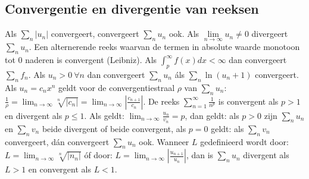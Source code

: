 \subsection{Convergentie en divergentie van reeksen}
Als $\sum\limits_n|u_n|$ convergeert, convergeert $\sum\limits_n u_n$ ook.
\npar
Als $\lim\limits_{n\rightarrow\infty}u_n\neq0$ divergeert $\sum\limits_n u_n$.
\npar
Een alternerende reeks waarvan de termen in absolute waarde monotoon tot 0
naderen is convergent (Leibniz).
\npar
Als $\int_p^{\infty}f(x)dx<\infty$ dan convergeert $\sum\limits_n f_n$.
\npar
Als $u_n>0~\forall n$ dan convergeert $\sum\limits_n u_n$ \'als
$\sum\limits_n\ln(u_n+1)$ convergeert.
\npar
Als $u_n=c_nx^n$ geldt voor de convergentiestraal $\rho$ van
$\sum\limits_n u_n$:
$\displaystyle\frac{1}{\rho}=\lim_{n\rightarrow\infty}\sqrt[n]{|c_n|}=
\lim_{n\rightarrow\infty}\left|\frac{c_{n+1}}{c_n}\right|$.
\npar
De reeks $\displaystyle\sum_{n=1}^\infty \frac{1}{n^p}$ is convergent als
$p>1$ en divergent als $p\leq1$.
\npar
Als geldt:
$\displaystyle\lim_{n\rightarrow\infty}\frac{u_n}{v_n}=p$,
dan geldt: als $p>0$ zijn $\sum\limits_{n}u_n$ en $\sum\limits_{n}v_n$ beide
divergent of beide convergent, als $p=0$ geldt: als $\sum\limits_{n}v_n$
convergeert, d\'an convergeert $\sum\limits_{n}u_n$ ook.
\npar
Wanneer $L$ gedefinieerd wordt door:
$\displaystyle L=\lim_{n\rightarrow\infty}\sqrt[n]{|n_n|}$ \'of door:
$\displaystyle L=\lim_{n\rightarrow\infty}\left|\frac{u_{n+1}}{u_n}\right|$,
dan is $\sum\limits_{n}u_n$ divergent als $L>1$ en convergent als $L<1$.

